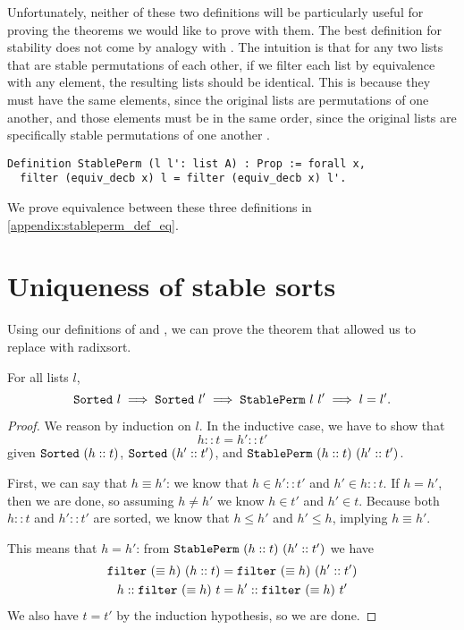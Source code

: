 \documentclass[sigplan,10pt,anonymous,review]{thesis}
\begin{document}
Unfortunately, neither of these two definitions will be particularly
useful for proving the theorems we would like to prove with them. The
best definition for stability does not come by analogy with
. The intuition is that for any two lists that are
stable permutations of each other, if we filter each list by
equivalence with any element, the resulting lists should be identical.
This is because they must have the same elements, since the original
lists are permutations of one another, and those elements must be in
the same order, since the original lists are specifically stable
permutations of one another \cite{leroy_2018}.
\begin{lstlisting}
Definition StablePerm (l l': list A) : Prop := forall x,
  filter (equiv_decb x) l = filter (equiv_decb x) l'.
\end{lstlisting}
We prove equivalence between these three definitions in
\cref{appendix:stableperm_def_eq}.

\section{Uniqueness of stable sorts}
\label{sec:unique}

Using our definitions of  and , we can
prove the theorem that allowed us to replace  with
radixsort.

\begin{theorem}
  For all lists $l$,
  \begin{equation*}
    \texttt{\textup{Sorted}}~l \implies \texttt{\textup{Sorted}}~l' \implies
    \texttt{\textup{StablePerm}}~l~l' \implies l = l'.
  \end{equation*}
\end{theorem}
\begin{proof}
  We reason by induction on $l$. In the inductive case, we have to
  show that
  \begin{equation*}
    h :: t = h' :: t'
  \end{equation*}
  given $\texttt{\textup{Sorted}}~(h :: t)$, $\texttt{\textup{Sorted}}~(h' :: t')$, and
  $\texttt{\textup{StablePerm}}~(h :: t)~(h' :: t')$.

  First, we can say that $h \equiv h'$: we know that $h \in h' :: t'$ and $h'
  \in h :: t$. If $h = h'$, then we are done, so assuming $h \neq h'$ we
  know $h \in t'$ and $h' \in t$. Because both $h::t$ and $h'::t'$ are
  sorted, we know that $h \le h'$ and $h' \le h$, implying $h \equiv h'$.

  This means that $h = h'$: from $\texttt{\textup{StablePerm}}~(h :: t)~(h' ::
  t')$ we have
  \begin{align*}
    \texttt{\textup{filter}}~(\equiv h)~(h :: t) &= \texttt{\textup{filter}}~(\equiv h)~(h' :: t') \\
    h :: \texttt{\textup{filter}}~(\equiv h)~t &= h' :: \texttt{\textup{filter}}~(\equiv h)~t'
  \end{align*}
  We also have $t = t'$ by the induction hypothesis, so we are done.
\end{proof}
\end{document}
